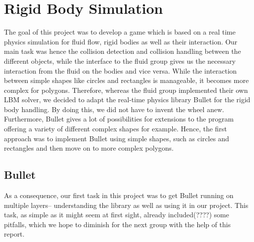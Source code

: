 \section{Rigid Body Simulation}

The goal of this project was to develop a game which is based on a real time physics simulation for fluid flow, rigid bodies as well as their interaction. Our main task was hence the collision detection and collision handling between the different objects, while the interface to the fluid group gives us the necessary interaction from the fluid on the bodies and vice versa. While the interaction between simple shapes like circles and rectangles is manageable, it becomes more complex for polygons. Therefore, whereas the fluid group implemented their own LBM solver, we decided to adapt the real-time physics library Bullet \cite{bullet}  for the rigid body handling. By doing this, we did not have to invent the wheel anew. Furthermore, Bullet gives a lot of possibilities for extensions to the program offering a variety of different complex shapes for example. Hence, the first approach was to implement Bullet using simple shapes, such as circles and rectangles and then move on to more complex polygons.

\subsection{Bullet}
As a consequence, our first task in this project was to get Bullet running on multiple layers-- understanding the library as well as using it in our project. This task, as simple as it might seem at first sight, already included(????) some pitfalls, which we hope to diminish for the next group with the help of this report. 
